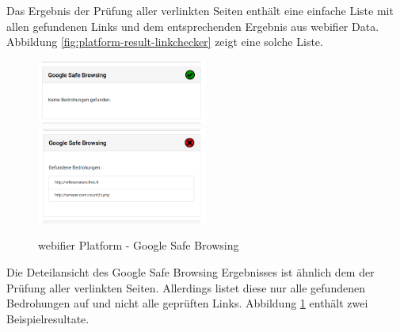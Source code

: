 Das Ergebnis der Prüfung aller verlinkten Seiten enthält eine einfache Liste mit allen gefundenen Links und dem entsprechenden Ergebnis aus webifier Data. Abbildung \ref{fig:platform-result-linkchecker} zeigt eine solche Liste.

\begin{figure}[H]
\centerline{%
\includegraphics[width=0.5\textwidth]{images/platform/google-safe-browsing-clean}%
\includegraphics[width=0.5\textwidth]{images/platform/google-safe-browsing-malicious}%
}%
\caption{webifier Platform - Google Safe Browsing}
\label{fig:platform-result-google-safe-browsing}
\end{figure}

Die Deteilansicht des Google Safe Browsing Ergebnisses ist ähnlich dem der Prüfung aller verlinkten Seiten. Allerdings listet diese nur alle gefundenen Bedrohungen auf und nicht alle geprüften Links. Abbildung \ref{fig:platform-result-google-safe-browsing} enthält zwei Beispielresultate.

